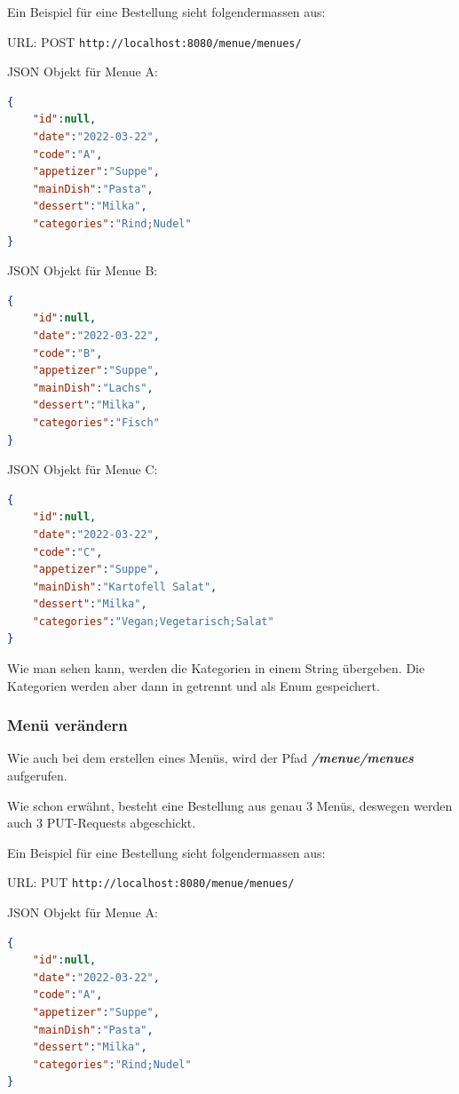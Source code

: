 Ein Beispiel für eine Bestellung sieht folgendermassen aus:

URL: POST \colorbox{white}{\lstinline[basicstyle=\ttfamily\color{black},language=html]|http://localhost:8080/menue/menues/|}


JSON Objekt für Menue A:

\begin{lstlisting}[language=json,firstnumber=1]
{
    "id":null,
    "date":"2022-03-22",
    "code":"A",
    "appetizer":"Suppe",
    "mainDish":"Pasta",
    "dessert":"Milka",
    "categories":"Rind;Nudel"
}
\end{lstlisting}

JSON Objekt für Menue B:

\begin{lstlisting}[language=json,firstnumber=1]
{
    "id":null,
    "date":"2022-03-22",
    "code":"B",
    "appetizer":"Suppe",
    "mainDish":"Lachs",
    "dessert":"Milka",
    "categories":"Fisch"
}
\end{lstlisting}

JSON Objekt für Menue C:

\begin{lstlisting}[language=json,firstnumber=1]
{
    "id":null,
    "date":"2022-03-22",
    "code":"C",
    "appetizer":"Suppe",
    "mainDish":"Kartofell Salat",
    "dessert":"Milka",
    "categories":"Vegan;Vegetarisch;Salat"
}
\end{lstlisting}

Wie man sehen kann, werden die Kategorien in einem String übergeben. Die Kategorien werden aber dann in getrennt und als Enum gespeichert.

\subsubsection{Menü verändern}

Wie auch bei dem erstellen eines Menüs, wird der Pfad \textbf{\textit{/menue/menues}} aufgerufen. 

Wie schon erwähnt, besteht eine Bestellung aus genau 3 Menüs, deswegen werden auch 3 PUT-Requests abgeschickt.

Ein Beispiel für eine Bestellung sieht folgendermassen aus:

URL: PUT \colorbox{white}{\lstinline[basicstyle=\ttfamily\color{black},language=html]|http://localhost:8080/menue/menues/|}

JSON Objekt für Menue A:

\begin{lstlisting}[language=json,firstnumber=1]
{
    "id":null,
    "date":"2022-03-22",
    "code":"A",
    "appetizer":"Suppe",
    "mainDish":"Pasta",
    "dessert":"Milka",
    "categories":"Rind;Nudel"
}
\end{lstlisting}


